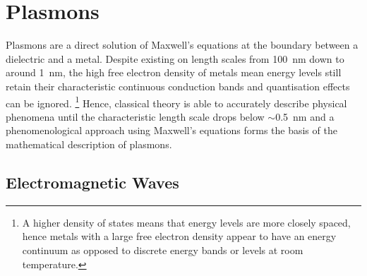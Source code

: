 \documentclass{article}
\begin{document}
\section{Plasmons}
\label{sec:plasmons}

Plasmons are a direct solution of Maxwell's equations at the boundary between a dielectric and a metal. Despite existing on length scales from \SI{100}{nm} down to around \SI{1}{nm}, the high free electron density of metals mean energy levels still retain their characteristic continuous conduction bands and quantisation effects can be ignored.%
\footnote{A higher density of states means that energy levels are more closely spaced, hence metals with a large free electron density appear to have an energy continuum as opposed to discrete energy bands or levels at room temperature.}
Hence, classical theory is able to accurately describe physical phenomena until the characteristic length scale drops below $\sim$\SI{0.5}{nm} and a phenomenological approach using Maxwell's equations forms the basis of the mathematical description of plasmons.

\subsection{Electromagnetic Waves}
\label{sec:em_waves}
\end{document}
